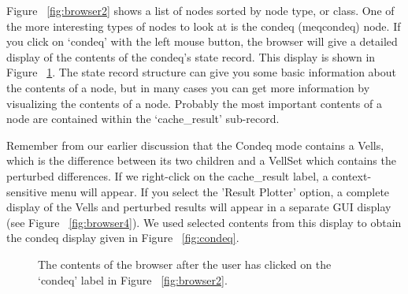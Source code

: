 \documentclass[10pt]{article}
\begin{document}
Figure  ~\ref{fig:browser2} shows a list of nodes sorted by node type, or
class. One of the more interesting types of nodes to look at is the 
condeq (meqcondeq) node. If you click on `condeq' with the left mouse
button, the browser will give a detailed display of the contents of the
condeq's state record. This display is shown in Figure ~\ref{fig:browser3}.
The state record structure can give you some basic information about
the contents of a node, but in many cases you can get more information
by visualizing the contents of a node. Probably the most important
contents of a node are contained within the `cache\_result' sub-record.

Remember from our earlier discussion that the Condeq mode contains
a Vells, which is the difference between its two children and a
VellSet which contains the perturbed differences. If we right-click
on the cache\_result label, a context-sensitive menu will appear.
If you select the 'Result Plotter' option, a complete display of 
the Vells and perturbed results will appear in a separate GUI
display (see Figure ~\ref{fig:browser4}). We used selected contents
from this display to obtain the condeq display given in 
Figure  ~\ref{fig:condeq}.

\begin{figure}
{\par\centering
{}
\par}
\caption {The contents of the browser after the user has clicked on the
`condeq' label in Figure ~\ref{fig:browser2}. }
\label{fig:browser3}
\end{figure}
\end{document}
